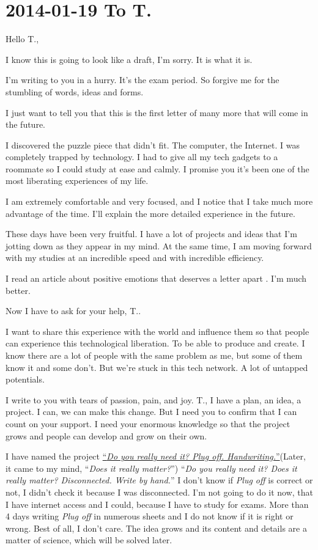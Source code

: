 \documentclass[]{book}
\begin{document}
\hypertarget{totomas20140119}{%
\section*{2014-01-19 To T.}\label{totomas20140119}}

Hello T.,

I know this is going to look like a draft, I'm sorry. It is what it is.

I'm writing to you in a hurry. It's the exam period. So forgive me for the stumbling of words, ideas and forms.

I just want to tell you that this is the first letter of many more that will come in the future.

I discovered the puzzle piece that didn't fit. The computer, the Internet. I was completely trapped by technology. I had to give all my tech gadgets to a roommate so I could study at ease and calmly. I promise you it's been one of the most liberating experiences of my life.

I am extremely comfortable and very focused, and I notice that I take much more advantage of the time. I'll explain the more detailed experience in the future.

These days have been very fruitful. I have a lot of projects and ideas that I'm jotting down as they appear in my mind. At the same time, I am moving forward with my studies at an incredible speed and with incredible efficiency.

I read an article about positive emotions that deserves a letter apart \citep{fredrickson2001role}. I'm much better.

Now I have to ask for your help, T..

I want to share this experience with the world and influence them so that people can experience this technological liberation. To be able to produce and create. I know there are a lot of people with the same problem as me, but some of them know it and some don't. But we're stuck in this tech network. A lot of untapped potentials.

I write to you with tears of passion, pain, and joy. T., I have a plan, an idea, a project. I can, we can make this change. But I need you to confirm that I can count on your support. I need your enormous knowledge so that the project grows and people can develop and grow on their own.

I have named the project \href{https://desconectando-unplugging.blogspot.com}{``\emph{Do you really need it? Plug off. Handwriting.}''}(Later, it came to my mind, ``\emph{Does it really matter?}'') ``\emph{Do you really need it? Does it really matter? Disconnected. Write by hand.}'' I don't know if \emph{Plug off} is correct or not, I didn't check it because I was disconnected. I'm not going to do it now, that I have internet access and I could, because I have to study for exams. More than 4 days writing \emph{Plug off} in numerous sheets and I do not know if it is right or wrong. Best of all, I don't care. The idea grows and its content and details are a matter of science, which will be solved later.
\end{document}

